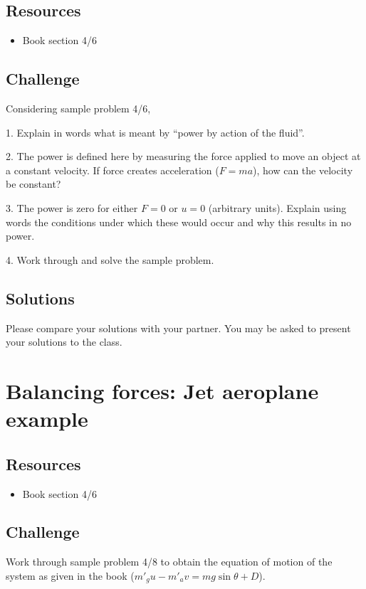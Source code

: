 \subsection*{Resources}
\begin{itemize}
    \item Book section 4/6
\end{itemize}

\subsection*{Challenge}
Considering sample problem 4/6,

1. Explain in words what is meant by ``power by action of the fluid''.

2. The power is defined here by measuring the force applied to move an object at a constant velocity. If force creates acceleration ($F=ma$), how can the velocity be constant?

3. The power is zero for either $F=0$ or $u=0$ (arbitrary units). Explain using words the conditions under which these would occur and why this results in no power.

4. Work through and solve the sample problem.

\subsection*{Solutions}
Please compare your solutions with your partner. You may be asked to present your solutions to the class.




\newpage
\section{Balancing forces: Jet aeroplane example}

\subsection*{Resources}
\begin{itemize}
    \item Book section 4/6
\end{itemize}

\subsection*{Challenge}
Work through sample problem 4/8 to obtain the equation of motion of the system as given in the book ($m'_gu-m'_av=mg\sin{\theta}+D$).





